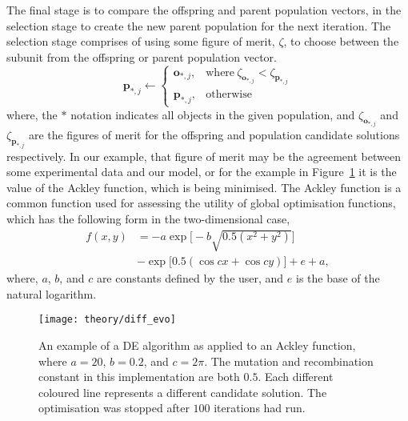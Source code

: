 The final stage is to compare the offspring and parent population vectors, in the selection stage to create the new parent population for the next iteration.
The selection stage comprises of using some figure of merit, $\zeta$, to choose between the subunit from the offspring or parent population vector.
%
\begin{equation}
    \mathbf{p}_{*,j} \leftarrow
    \begin{cases}
        \mathbf{o}_{*,j}, & \text{where}\ \zeta_{\mathbf{o}_{*,j}} < \zeta_{\mathbf{p}_{*,j}} \\
        \mathbf{p}_{*,j}, & \text{otherwise}
    \end{cases}
\end{equation}
%
where, the $*$ notation indicates all objects in the given population, and $\zeta_{\mathbf{o}_{*,j}}$ and $\zeta_{\mathbf{p}_{*,j}}$ are the figures of merit for the offspring and population candidate solutions respectively.
In our example, that figure of merit may be the agreement between some experimental data and our model, or for the example in Figure~\ref{fig:diff_evo} it is the value of the Ackley function,\autocite{ackley_connectionist_1987} which is being minimised.
The Ackley function is a common function used for assessing the utility of global optimisation functions, which has the following form in the two-dimensional case, 
%
\begin{equation}
\begin{aligned}
f(x,y) & = -a \exp{\big[-b\sqrt{0.5(x^2 + y^2)}\big]} \\
 & - \exp{\big[0.5(\cos{cx} + \cos{cy})\big]} + e + a,
\end{aligned}
\end{equation}
%
where, $a$, $b$, and $c$ are constants defined by the user, and $e$ is the base of the natural logarithm. 
%
\begin{figure}[t]
    \centering
    \texttt{[image: theory/diff\_evo]}
    \caption{An example of a DE algorithm as applied to an Ackley function, where $a=20$, $b=0.2$, and $c=2\pi$. The mutation and recombination constant in this implementation are both $0.5$. Each different coloured line represents a different candidate solution. The optimisation was stopped after $100$ iterations had run.}
    \label{fig:diff_evo}
\end{figure}
%

